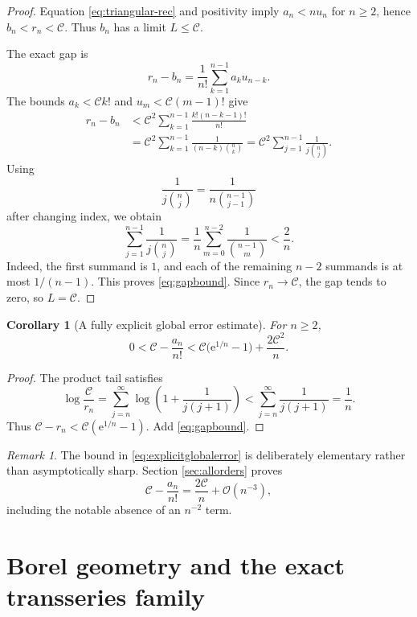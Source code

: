 \documentclass[11pt,a4paper]{article}
\newtheorem{corollary}[theorem]{Corollary}
\theoremstyle{definition}
\theoremstyle{remark}
\newtheorem{remark}[theorem]{Remark}
\newcommand{\e}{\mathrm{e}}
\newcommand{\bigO}{\mathcal{O}}
\newcommand{\constC}{\mathcal{C}}
\begin{document}
\begin{proof}
Equation \eqref{eq:triangular-rec} and positivity imply \(a_n<n u_n\) for \(n\ge2\), hence \(b_n<r_n<\constC\).  Thus \(b_n\) has a limit \(L\le\constC\).

The exact gap is
\begin{equation}\label{eq:exactgap}
 r_n-b_n
 =\frac{1}{n!}\sum_{k=1}^{n-1}a_k u_{n-k}.
\end{equation}
The bounds \(a_k<\constC k!\) and \(u_m<\constC(m-1)!\) give
\begin{align*}
 r_n-b_n
 &<\constC^2\sum_{k=1}^{n-1}
 \frac{k!(n-k-1)!}{n!}\\
 &=\constC^2\sum_{k=1}^{n-1}
 \frac{1}{(n-k)\binom{n}{k}}
 =\constC^2\sum_{j=1}^{n-1}
 \frac{1}{j\binom{n}{j}}.
\end{align*}
Using
\[
 \frac{1}{j\binom{n}{j}}
 =\frac{1}{n\binom{n-1}{j-1}}
\]
after changing index, we obtain
\[
 \sum_{j=1}^{n-1}\frac{1}{j\binom{n}{j}}
 =\frac1n\sum_{m=0}^{n-2}\frac{1}{\binom{n-1}{m}}
 <\frac{2}{n}.
\]
Indeed, the first summand is \(1\), and each of the remaining \(n-2\) summands is at most \(1/(n-1)\).  This proves \eqref{eq:gapbound}.  Since \(r_n\to\constC\), the gap tends to zero, so \(L=\constC\).
\end{proof}

\begin{corollary}[A fully explicit global error estimate]\label{cor:globalerror}
For \(n\ge2\),
\begin{equation}\label{eq:explicitglobalerror}
 0<\constC-\frac{a_n}{n!}
 <\constC\bigl(\e^{1/n}-1\bigr)+\frac{2\constC^2}{n}.
\end{equation}
\end{corollary}

\begin{proof}
The product tail satisfies
\[
 \log\frac{\constC}{r_n}
 =\sum_{j=n}^{\infty}\log\left(1+\frac{1}{j(j+1)}\right)
 <\sum_{j=n}^{\infty}\frac{1}{j(j+1)}=\frac1n.
\]
Thus \(\constC-r_n<\constC(\e^{1/n}-1)\).  Add \eqref{eq:gapbound}.
\end{proof}

\begin{remark}
The bound in \eqref{eq:explicitglobalerror} is deliberately elementary rather than asymptotically sharp.  Section \ref{sec:allorders} proves
\[
 \constC-\frac{a_n}{n!}=\frac{2\constC}{n}+\bigO(n^{-3}),
\]
including the notable absence of an \(n^{-2}\) term.
\end{remark}

\section{Borel geometry and the exact transseries family}\label{sec:borel}
\end{document}
